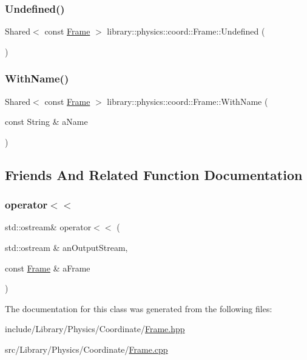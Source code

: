 \subsubsection{\texorpdfstring{Undefined()}{Undefined()}}
{\footnotesize\ttfamily Shared$<$ const \hyperlink{classlibrary_1_1physics_1_1coord_1_1_frame}{Frame} $>$ library\+::physics\+::coord\+::\+Frame\+::\+Undefined (\begin{DoxyParamCaption}{ }\end{DoxyParamCaption})\hspace{0.3cm}{\ttfamily [static]}}

\mbox{\label{classlibrary_1_1physics_1_1coord_1_1_frame_ad4b2b9a19b234d27ea56ea8b21107f9b}} 
\subsubsection{\texorpdfstring{With\+Name()}{WithName()}}
{\footnotesize\ttfamily Shared$<$ const \hyperlink{classlibrary_1_1physics_1_1coord_1_1_frame}{Frame} $>$ library\+::physics\+::coord\+::\+Frame\+::\+With\+Name (\begin{DoxyParamCaption}\item[{const String \&}]{a\+Name }\end{DoxyParamCaption})\hspace{0.3cm}{\ttfamily [static]}}



\subsection{Friends And Related Function Documentation}
\mbox{\label{classlibrary_1_1physics_1_1coord_1_1_frame_a509ac1926cfc3553748bace204e2b1cc}} 
\subsubsection{\texorpdfstring{operator$<$$<$}{operator<<}}
{\footnotesize\ttfamily std\+::ostream\& operator$<$$<$ (\begin{DoxyParamCaption}\item[{std\+::ostream \&}]{an\+Output\+Stream,  }\item[{const \hyperlink{classlibrary_1_1physics_1_1coord_1_1_frame}{Frame} \&}]{a\+Frame }\end{DoxyParamCaption})\hspace{0.3cm}{\ttfamily [friend]}}



The documentation for this class was generated from the following files\+:\begin{DoxyCompactItemize}
\item 
include/\+Library/\+Physics/\+Coordinate/\hyperlink{_frame_8hpp}{Frame.\+hpp}\item 
src/\+Library/\+Physics/\+Coordinate/\hyperlink{_frame_8cpp}{Frame.\+cpp}\end{DoxyCompactItemize}
